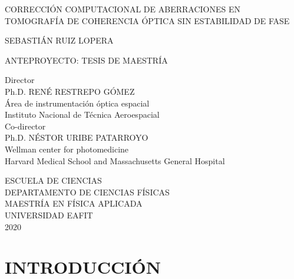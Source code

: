 \documentclass[letter, 12 pt]{article}
\renewcommand{\contentsname}{Contenido}	%
\begin{document}
\sectionfont{\fontsize{12}{1}\selectfont\centering}
\subsectionfont{\fontsize{12}{1}\selectfont}
\thispagestyle{empty}

\begin{center}

 
CORRECCIÓN COMPUTACIONAL DE ABERRACIONES EN TOMOGRAFÍA DE COHERENCIA ÓPTICA SIN ESTABILIDAD DE FASE
\vfill

SEBASTIÁN RUIZ LOPERA
\vfill

ANTEPROYECTO: TESIS DE MAESTRÍA
\vfill

Director \\
Ph.D. RENÉ RESTREPO GÓMEZ \\
Área de instrumentación óptica espacial \\
Instituto Nacional de Técnica Aeroespacial \\
\vspace{\baselineskip}
Co-director \\
Ph.D. NÉSTOR URIBE PATARROYO \\
Wellman center for photomedicine \\
Harvard Medical School and Massachusetts General Hospital \\
\vfill

ESCUELA DE CIENCIAS \\
DEPARTAMENTO DE CIENCIAS FÍSICAS \\
MAESTRÍA EN FÍSICA APLICADA \\ 
UNIVERSIDAD EAFIT \\
2020
\end{center}

\thispagestyle{empty}
\newpage


\leavevmode\thispagestyle{empty}\newpage
\addtocounter{page}{-1}%
\renewcommand{\contentsname}{CONTENIDO}
\tableofcontents
\newpage
\setcounter{page}{3}


\section{INTRODUCCIÓN}
\end{document}
